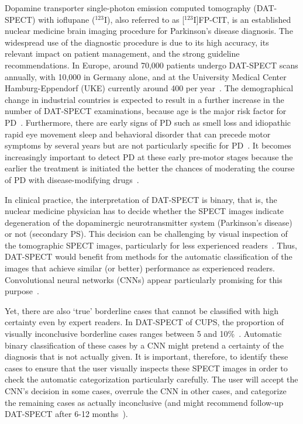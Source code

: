 Dopamine transporter single-photon emission computed tomography (DAT-SPECT) 
with ioflupane ($^{123}$I), also referred to as [$^{123}$I]FP-CIT, 
is an established nuclear medicine brain imaging procedure for Parkinson's disease diagnosis.
The widespread use of the diagnostic procedure is due to its high accuracy, its relevant impact on patient management, 
and the strong guideline recommendations.
In Europe, around 70,000 patients undergo DAT-SPECT scans annually, with 10,000 in Germany alone,
and at the University Medical Center Hamburg-Eppendorf (UKE) currently around 400 per year~\citep{Marienhagen2017}.
The demographical change in industrial countries is expected to result in a further increase in the number of DAT-SPECT examinations, 
because age is the major risk factor for PD~\citep{Reeve2014}.
Furthermore, there are early signs of PD such as smell loss and idiopathic rapid eye movement sleep and behavioral disorder 
that can precede motor symptoms by several years but are not particularly specific for PD~\citep{Iranzo2017, Postuma2019may, Postuma2019mar}.
It becomes increasingly important to detect PD at these early pre-motor stages because the earlier the treatment is initiated the better 
the chances of moderating the course of PD with disease-modifying drugs~\citep{Kim2017}.


In clinical practice, the interpretation of DAT-SPECT is binary, that is, the nuclear medicine physician has to decide whether the SPECT images 
indicate degeneration of the dopaminergic neurotransmitter system (Parkinson's disease) or not (secondary PS). 
This decision can be challenging by visual inspection of the tomographic SPECT images, particularly for less experienced readers~\citep{Schiebler2023}.
Thus, DAT-SPECT would benefit from methods for the automatic classification of the images that achieve similar (or better) performance as experienced readers. 
Convolutional neural networks (CNNs) appear particularly promising for this purpose~\citep{Wenzel2019, Chien2020, Magesh2020, Hathaliya2022, Nazari2022}.


Yet, there are also `true' borderline cases that cannot be classified with high certainty even by expert readers. 
In DAT-SPECT of CUPS, the proportion of visually inconclusive borderline cases ranges between 5 and 10\%~\citep{Makinen2016, Albert2016}.
Automatic binary classification of these cases by a CNN might pretend a certainty of the diagnosis that is not actually given. 
It is important, therefore, to identify these cases to ensure that the user visually inspects these SPECT images 
in order to check the automatic categorization particularly carefully. 
The user will accept the CNN's decision in some cases, overrule the CNN in other cases, and categorize the remaining cases as 
actually inconclusive (and might recommend follow-up DAT-SPECT after 6-12 months~\citep{Apostolova2017}).

